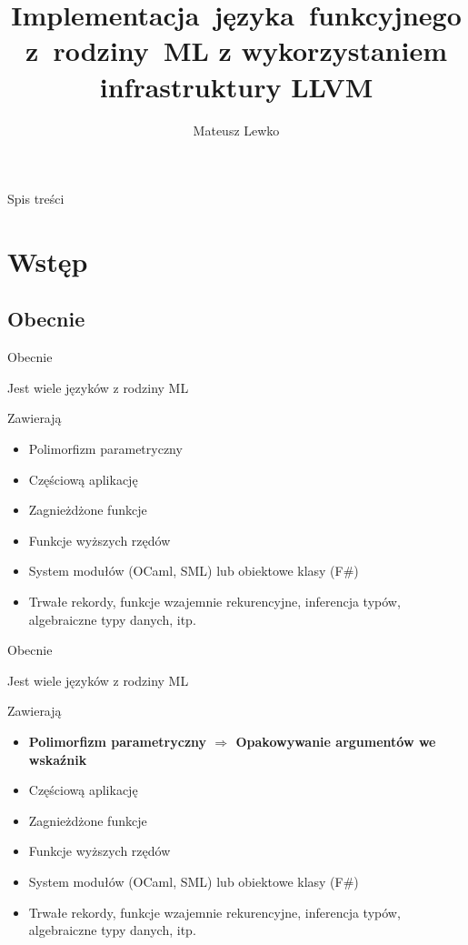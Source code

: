 \documentclass{beamer}
\title[Implementacja~języka~funkcyjnego z~rodziny~ML]
{Implementacja~języka~funkcyjnego \newline z~rodziny~ML \newline
z wykorzystaniem infrastruktury LLVM}
\author{Mateusz Lewko}
\begin{document}
\begin{frame}
  \titlepage
\end{frame}

\begin{frame}{Spis treści}
  \tableofcontents
\end{frame}

\section{Wstęp}

\subsection{Obecnie}
\begin{frame}{Obecnie}
\begin{itemize}
    \item {
        Jest wiele języków z rodziny ML
    \pause
    \item Zawierają
        \begin{itemize}
            \pause
            \item Polimorfizm parametryczny \pause
            \item Częściową aplikację \pause
            \item Zagnieżdżone funkcje \pause
            \item Funkcje wyższych rzędów \pause
            \item System modułów (OCaml, SML) lub obiektowe klasy (F\#) \pause
            \item Trwałe rekordy, funkcje wzajemnie rekurencyjne, 
            inferencja typów, algebraiczne typy danych, itp.
        \end{itemize}
    }
\end{itemize}
\end{frame}

\begin{frame}{Obecnie}
\begin{itemize}
    \item { 
        Jest wiele języków z rodziny ML
    \item Zawierają
        \begin{itemize}
            \item \textbf{Polimorfizm parametryczny $\Rightarrow$ Opakowywanie 
            argumentów we wskaźnik}
            \item Częściową aplikację
            \item Zagnieżdżone funkcje 
            \item Funkcje wyższych rzędów 
            \item System modułów (OCaml, SML) lub obiektowe klasy (F\#)
            \item Trwałe rekordy, funkcje wzajemnie rekurencyjne, 
            inferencja typów, algebraiczne typy danych, itp.
        \end{itemize}
    }
\end{itemize}
\end{frame}
\end{document}
